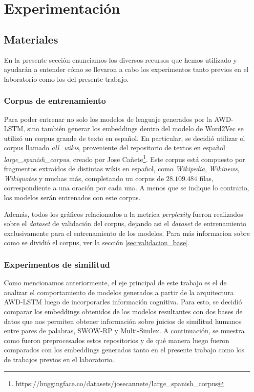 \chapter{Experimentación}

\section{Materiales}

En la presente sección enunciamos los diversos recursos que hemos utilizado y ayudarán a entender cómo se llevaron a cabo los experimentos tanto previos en el laboratorio como los del presente trabajo.

\subsection{Corpus de entrenamiento}

Para poder entrenar no solo los modelos de lenguaje generados por la AWD-LSTM, 
sino también generar los embeddings dentro del modelo de Word2Vec se utilizó un 
corpus grande de texto en español. En particular, se decidió utilizar el corpus 
llamado \textit{all\_wikis}, proveniente del repositorio de textos en español 
\textit{large\_spanish\_corpus}, creado por Jose Cañete\footnote{https://huggingface.co/datasets/josecannete/large\_spanish\_corpus}.
Este corpus está compuesto por fragmentos extraídos de distintas wikis en español, 
como \textit{Wikipedia}, \textit{Wikinews}, \textit{Wikiquotes} y muchas más, completando un corpus de $28.109.484$ filas, 
correspondiente a una oración por cada una. A menos que se indique lo contrario, 
los modelos serán entrenados con este corpus.

Además, todos los gráficos relacionados a la metrica \textit{perplexity} fueron realizados sobre el \textit{dataset} de validación del corpus, dejando asi el \textit{dataset} de entrenamiento exclusivamente para el entrenamiento de los modelos. Para más informacion sobre como se dividió el corpus, ver la sección \ref{sec:validacion_base}.


\subsection{Experimentos de similitud}

\label{sec:experimentos_similitud}

Como mencionamos anteriormente, el eje principal de este trabajo es el de analizar el 
comportamiento de modelos generados a partir de la arquitectura AWD-LSTM luego de incorporarles 
información cognitiva. Para esto, se decidió comparar los embeddings obtenidos de los modelos 
resultantes con dos bases de datos que nos permiten obtener información sobre juicios de similitud 
humanos entre pares de palabras, SWOW-RP y Multi-Simlex. A continuación, se muestra como fueron 
preprocesados estos repositorios y de qué manera luego fueron comparados con los embeddings 
generados tanto en el presente trabajo como los de trabajos previos en el laboratorio.

